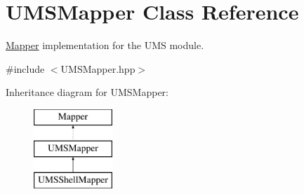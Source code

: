 \hypertarget{classUMSMapper}{
\section{UMSMapper Class Reference}
\label{classUMSMapper}
}


\hyperlink{classMapper}{Mapper} implementation for the UMS module.  




{\ttfamily \#include $<$UMSMapper.hpp$>$}

Inheritance diagram for UMSMapper:\begin{figure}[H]
\begin{center}
\leavevmode
\includegraphics[height=3.000000cm]{classUMSMapper}
\end{center}
\end{figure}
